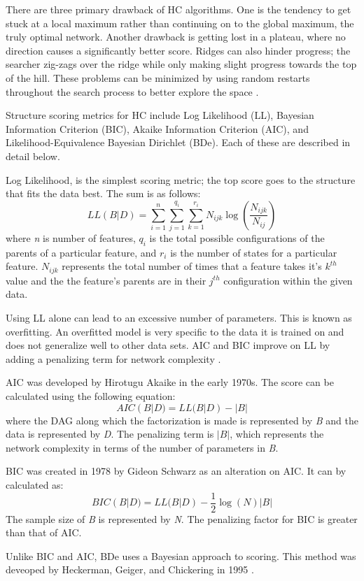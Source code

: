 There are three primary drawback of HC algorithms. One is the tendency to get stuck at a local maximum rather than continuing on to the global maximum, the truly optimal network. Another drawback is getting lost in a plateau, where no direction causes a significantly better score. Ridges can also hinder progress; the searcher zig-zags over the ridge while only making slight progress towards the top of the hill. These problems can be minimized by using random restarts throughout the search process to better explore the space \cite{Russell1995}.

Structure scoring metrics for HC include Log Likelihood (LL), Bayesian Information Criterion (BIC), Akaike Information Criterion (AIC), and Likelihood-Equivalence Bayesian Dirichlet (BDe). Each of these are described in detail below.

 Log Likelihood, is the simplest scoring metric; the top score goes to the structure that fits the data best. The sum is as follows:
 \begin{equation}
    LL(B | D) = \sum_{i=1}^{n}\sum_{j=1}^{q_i}\sum_{k=1}^{r_i}N_{ijk}\log(\frac{N_{ijk}}{N_{ij}})
\end{equation}
 where \textit{n} is number of features, $q_i$ is the total possible configurations of the parents of a particular feature, and $r_i$ is the number of states for a particular feature. $N_{ijk}$ represents the total number of times that a feature takes it's $k^{th}$ value and the the feature's parents are in their $j^{th}$ configuration within the given data.
 
 
 Using LL alone can lead to an excessive number of parameters. This is known as overfitting. An overfitted model is very specific to the data it is trained on and does not generalize well to other data sets. AIC and BIC improve on LL by adding a penalizing term for network complexity \cite{Vol2012}.

AIC was developed by Hirotugu Akaike \cite{Akaike1974} in the early 1970s. The score can be calculated using the following equation:
\begin{equation}
    AIC(B | D) = LL(B | D) - |B|
\end{equation}
where the DAG along which the factorization is made is represented by \textit{B} and the data is represented by \textit{D}. The penalizing term is \begin{math}|B|\end{math}, which represents the network complexity in terms of the number of parameters in \textit{B}.

BIC was created in 1978 by Gideon Schwarz \cite{Schwarz1978} as an alteration on AIC. It can by calculated as:
\begin{equation}
    BIC(B | D) = LL(B | D) - \frac{1}{2}\log(N)|B|
\end{equation}
  The sample size of \textit{B} is represented by \textit{N}. The penalizing factor for BIC is greater than that of AIC.

Unlike BIC and AIC, BDe uses a Bayesian approach to scoring. This method was deveoped by Heckerman, Geiger, and Chickering in 1995 \cite{Heckerman1995}.
